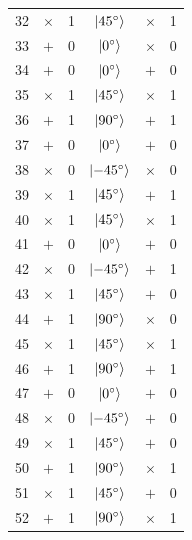 \begin{longtable}{c|cc|ccc}
  32 & $\times$      & 1 & $\ket{\SI{+45}{\degree}}$  & $\times$ & 1 \\
  33 & $+$      & 0 & $\ket{\SI{0}{\degree}}$    & $\times$ & 0 \\
  \rowcolor{green!20}

  34 & $+$ & 0 & $\ket{\SI{0}{\degree}}$   & $+$      & 0 \\
  \rowcolor{green!20}

  35 & $\times$      & 1 & $\ket{\SI{+45}{\degree}}$  & $\times$ & 1 \\
  \rowcolor{green!20}

  36 & $+$      & 1 & $\ket{\SI{90}{\degree}}$  & $+$      & 1 \\
  \rowcolor{green!20}

  37 & $+$ & 0 & $\ket{\SI{0}{\degree}}$    & $+$ & 0 \\
  \rowcolor{green!20}

  38 & $\times$ & 0 & $\ket{\SI{-45}{\degree}}$ & $\times$ & 0 \\
  39 & $\times$ & 1 & $\ket{\SI{45}{\degree}}$  & $+$ & 1 \\
  \rowcolor{green!20}

  40 & $\times$ & 1 & $\ket{\SI{45}{\degree}}$   & $\times$ & 1 \\
  \rowcolor{green!20}

  41 & $+$ & 0 & $\ket{\SI{0}{\degree}}$ & $+$ & 0 \\
  42 & $\times$ & 0 & $\ket{\SI{-45}{\degree}}$ & $+$ & 1 \\
  43 & $\times$ & 1 & $\ket{\SI{+45}{\degree}}$   & $+$ & 0 \\
  44 & $+$ & 1 & $\ket{\SI{90}{\degree}}$   & $\times$ & 0 \\
  \rowcolor{green!20}

  45 & $\times$ & 1 & $\ket{\SI{45}{\degree}}$  & $\times$ & 1 \\
  \rowcolor{green!20}

  46 & $+$ & 1 & $\ket{\SI{90}{\degree}}$   & $+$ & 1 \\
  \rowcolor{green!20}

  47 & $+$ & 0 & $\ket{\SI{0}{\degree}}$    & $+$ & 0 \\
  48 & $\times$ & 0 & $\ket{\SI{-45}{\degree}}$ & $+$ & 0 \\
  49 & $\times$ & 1 & $\ket{\SI{45}{\degree}}$  & $+$ & 0 \\
  50 & $+$ & 1 & $\ket{\SI{90}{\degree}}$   & $\times$ & 1 \\
  51 & $\times$ & 1 & $\ket{\SI{45}{\degree}}$  & $+$ & 0 \\
  52 & $+$ & 1 & $\ket{\SI{90}{\degree}}$   & $\times$ & 1 \\

\end{longtable}

